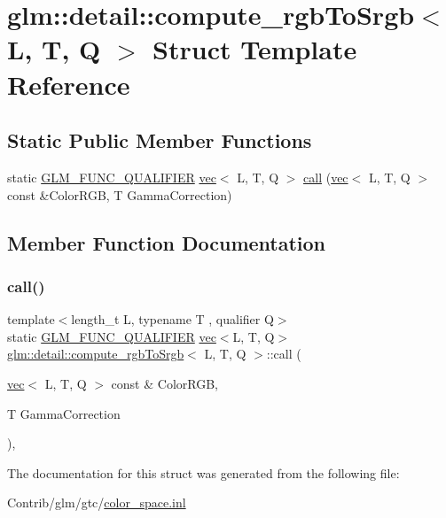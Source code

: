\hypertarget{structglm_1_1detail_1_1compute__rgb_to_srgb}{}\section{glm\+:\+:detail\+:\+:compute\+\_\+rgb\+To\+Srgb$<$ L, T, Q $>$ Struct Template Reference}
\label{structglm_1_1detail_1_1compute__rgb_to_srgb}
\subsection*{Static Public Member Functions}
\begin{DoxyCompactItemize}
\item 
static \mbox{\hyperlink{setup_8hpp_a33fdea6f91c5f834105f7415e2a64407}{G\+L\+M\+\_\+\+F\+U\+N\+C\+\_\+\+Q\+U\+A\+L\+I\+F\+I\+ER}} \mbox{\hyperlink{structglm_1_1vec}{vec}}$<$ L, T, Q $>$ \mbox{\hyperlink{structglm_1_1detail_1_1compute__rgb_to_srgb_a80f1b6c28ca418cc3eaf661e6714d7b5}{call}} (\mbox{\hyperlink{structglm_1_1vec}{vec}}$<$ L, T, Q $>$ const \&Color\+R\+GB, T Gamma\+Correction)
\end{DoxyCompactItemize}


\subsection{Member Function Documentation}
\mbox{\label{structglm_1_1detail_1_1compute__rgb_to_srgb_a80f1b6c28ca418cc3eaf661e6714d7b5}} 
\subsubsection{\texorpdfstring{call()}{call()}}
{\footnotesize\ttfamily template$<$length\+\_\+t L, typename T , qualifier Q$>$ \\
static \mbox{\hyperlink{setup_8hpp_a33fdea6f91c5f834105f7415e2a64407}{G\+L\+M\+\_\+\+F\+U\+N\+C\+\_\+\+Q\+U\+A\+L\+I\+F\+I\+ER}} \mbox{\hyperlink{structglm_1_1vec}{vec}}$<$L, T, Q$>$ \mbox{\hyperlink{structglm_1_1detail_1_1compute__rgb_to_srgb}{glm\+::detail\+::compute\+\_\+rgb\+To\+Srgb}}$<$ L, T, Q $>$\+::call (\begin{DoxyParamCaption}\item[{\mbox{\hyperlink{structglm_1_1vec}{vec}}$<$ L, T, Q $>$ const \&}]{Color\+R\+GB,  }\item[{T}]{Gamma\+Correction }\end{DoxyParamCaption})\hspace{0.3cm}{\ttfamily [inline]}, {\ttfamily [static]}}



The documentation for this struct was generated from the following file\+:\begin{DoxyCompactItemize}
\item 
Contrib/glm/gtc/\mbox{\hyperlink{gtc_2color__space_8inl}{color\+\_\+space.\+inl}}\end{DoxyCompactItemize}
